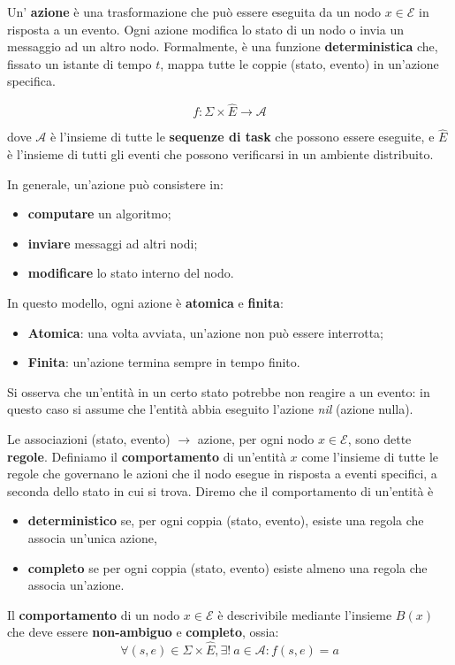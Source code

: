\begin{definizione}[Azione]
Un' \textbf{azione} è una trasformazione che può essere eseguita da un nodo $x \in \mathcal{E}$ in risposta a un evento. Ogni azione modifica lo stato di un nodo o invia un messaggio ad un altro nodo. Formalmente, è una funzione \textbf{deterministica} che, fissato un istante di tempo $t$, mappa tutte le coppie (stato, evento) in un'azione specifica.

\[
f: \Sigma \times \hat{E} \rightarrow \mathcal{A}
\]

dove $\mathcal{A}$ è l'insieme di tutte le \textbf{sequenze di task} che possono essere eseguite, e $\hat{E}$ è l'insieme di tutti gli eventi che possono verificarsi in un ambiente distribuito.

In generale, un'azione può consistere in:
\begin{itemize}
    \item \textbf{computare} un algoritmo;
    \item \textbf{inviare} messaggi ad altri nodi;
    \item \textbf{modificare} lo stato interno del nodo.
\end{itemize}

In questo modello, ogni azione è \textbf{atomica} e \textbf{finita}:
\begin{itemize}
    \item \textbf{Atomica}: una volta avviata, un'azione non può essere interrotta;
    \item \textbf{Finita}: un'azione termina sempre in tempo finito.
\end{itemize}

Si osserva che un'entità in un certo stato potrebbe non reagire a un evento: in questo caso si assume che l'entità abbia eseguito l'azione \textit{nil} (azione nulla).
\end{definizione}

\begin{definizione}
    Le associazioni (stato, evento) $\rightarrow$ azione, per ogni nodo $x \in \mathcal{E}$, sono dette \textbf{regole}. Definiamo il \textbf{comportamento} di un'entità $x$ come l'insieme di tutte le regole che governano le azioni che il nodo esegue in risposta a eventi specifici, a seconda dello stato in cui si trova. Diremo che il comportamento di un'entità è 
    \begin{itemize}
        \item \textbf{deterministico} se, per ogni coppia (stato, evento), esiste una regola che associa un'unica azione,
        \item \textbf{completo} se per ogni coppia (stato, evento) esiste almeno una regola che associa un'azione.
    \end{itemize}

    Il \textbf{comportamento} di un nodo $x \in \mathcal{E}$ è descrivibile mediante l'insieme $B(x)$ che deve essere \textbf{non-ambiguo} e \textbf{completo}, ossia:
    \[
    \forall (s, e) \in \Sigma \times \hat{E}, \exists!\ a \in \mathcal{A} : f(s, e) = a
    \]
\end{definizione}

